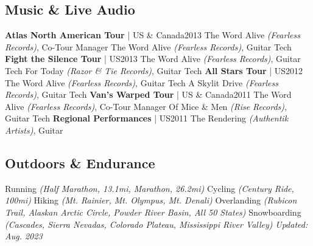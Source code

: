\documentclass{article}
\begin{document}
    \subsection*{Music \& Live Audio}
        \textbf{Atlas North American Tour} | US \& Canada\hfill{2013}\newline
        The Word Alive \textit{(Fearless Records)}, Co-Tour Manager\newline
        The Word Alive \textit{(Fearless Records)}, Guitar Tech\newline\newline
        \textbf{Fight the Silence Tour} | US\hfill{2013}\newline
        The Word Alive \textit{(Fearless Records)}, Guitar Tech\newline
        For Today \textit{(Razor \& Tie Records)}, Guitar Tech\newline\newline
        \textbf{All Stars Tour} | US\hfill{2012}\newline
        The Word Alive \textit{(Fearless Records)}, Guitar Tech\newline
        A Skylit Drive \textit{(Fearless Records)}, Guitar Tech\newline\newline
        \textbf{Van's Warped Tour} | US \& Canada\hfill{2011}\newline
        The Word Alive \textit{(Fearless Records)}, Co-Tour Manager\newline
        Of Mice \& Men \textit{(Rise Records)}, Guitar Tech\newline\newline
        \textbf{Regional Performances} | US\hfill{2011}\newline
        The Rendering \textit{(Authentik Artists)}, Guitar
    \subsection*{Outdoors \& Endurance}
        Running \textit{(Half Marathon, 13.1mi, Marathon, 26.2mi)}\newline
        Cycling \textit{(Century Ride, 100mi)}\newline
        Hiking \textit{(Mt. Rainier, Mt. Olympus, Mt. Denali)}\newline
        Overlanding \textit{(Rubicon Trail, Alaskan Arctic Circle, Powder River Basin, All 50 States)}\newline
        Snowboarding \textit{(Cascades, Sierra Nevadas, Colorado Plateau, Mississippi River Valley)}\newline
        \mbox{}
        \vfill
        \hfill{}\textit{Updated: Aug. 2023}
\end{document}
